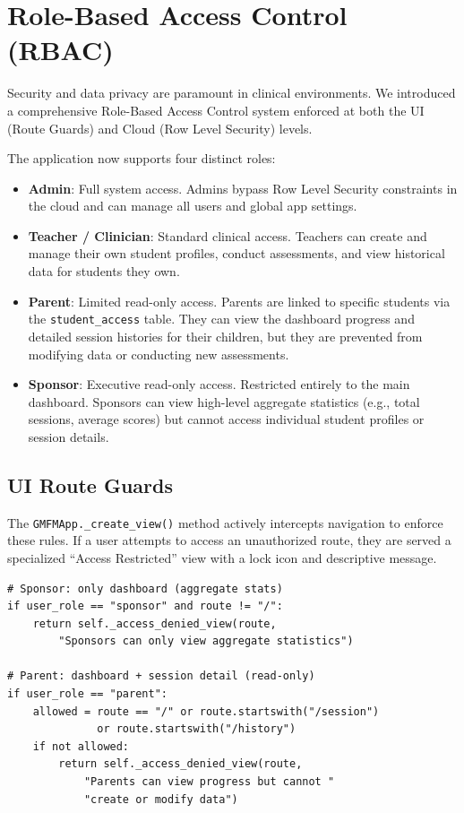 \documentclass[12pt,a4paper]{article}
\begin{document}
\section{Role-Based Access Control (RBAC)}

Security and data privacy are paramount in clinical environments. We introduced a comprehensive Role-Based Access Control system enforced at both the UI (Route Guards) and Cloud (Row Level Security) levels.

The application now supports four distinct roles:

\begin{itemize}[leftmargin=2em]
    \item \textbf{Admin}: Full system access. Admins bypass Row Level Security constraints in the cloud and can manage all users and global app settings.
    \item \textbf{Teacher / Clinician}: Standard clinical access. Teachers can create and manage their own student profiles, conduct assessments, and view historical data for students they own.
    \item \textbf{Parent}: Limited read-only access. Parents are linked to specific students via the \texttt{student\_access} table. They can view the dashboard progress and detailed session histories for their children, but they are prevented from modifying data or conducting new assessments.
    \item \textbf{Sponsor}: Executive read-only access. Restricted entirely to the main dashboard. Sponsors can view high-level aggregate statistics (e.g., total sessions, average scores) but cannot access individual student profiles or session details.
\end{itemize}

\subsection{UI Route Guards}

The \texttt{GMFMApp.\_create\_view()} method actively intercepts navigation to enforce these rules. If a user attempts to access an unauthorized route, they are served a specialized ``Access Restricted'' view with a lock icon and descriptive message.

\begin{lstlisting}[style=python, caption={Role-based route guard logic (simplified)}]
# Sponsor: only dashboard (aggregate stats)
if user_role == "sponsor" and route != "/":
    return self._access_denied_view(route,
        "Sponsors can only view aggregate statistics")

# Parent: dashboard + session detail (read-only)
if user_role == "parent":
    allowed = route == "/" or route.startswith("/session")
              or route.startswith("/history")
    if not allowed:
        return self._access_denied_view(route,
            "Parents can view progress but cannot "
            "create or modify data")
\end{lstlisting}
\end{document}
